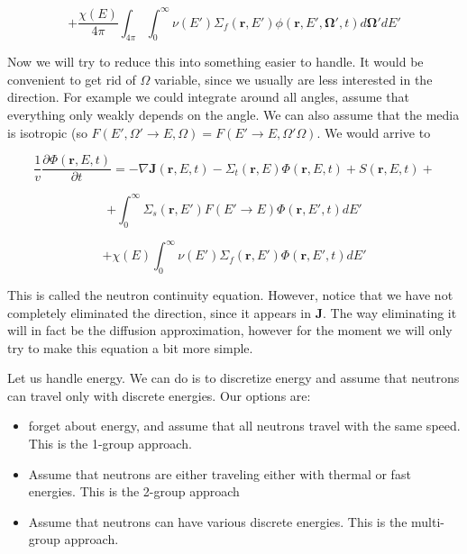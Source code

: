\begin{equation*}
+\frac{\chi(E)}{4\pi}\int_{4\pi}\int_{0}^\infty \nu(E')\Sigma_f(\mathbf{r},E')\phi(\mathbf{r},E',\mathbf{\Omega'},t)d\mathbf{\Omega'}dE'
\end{equation*}

Now we will try to reduce this into something easier to handle. It would be convenient to get rid of $\Omega$ variable, since we usually are less interested in the direction. For example we could integrate around all angles, assume that everything only weakly depends on the angle. We can also assume that the media is isotropic (so $F(E',\Omega' \rightarrow E,\Omega)=F(E'\rightarrow E,\Omega'\Omega)$. We would arrive to%

\begin{equation}
\frac{1}{v}\frac{\partial\Phi(\mathbf{r},E,t)}{\partial t}=-\nabla \mathbf{J}(\mathbf{r},E,t)-\Sigma_t(\mathbf{r},E)\Phi(\mathbf{r},E,t)+S(\mathbf{r},E,t) +
\end{equation}

\begin{equation*}
+\int_{0}^\infty \Sigma_s(\mathbf{r},E')F(E' \rightarrow E)\Phi(\mathbf{r},E',t)dE'
\end{equation*}

\begin{equation*}
+\chi(E)\int_{0}^\infty \nu(E')\Sigma_f(\mathbf{r},E')\Phi(\mathbf{r},E',t)dE'
\end{equation*}

This is called the neutron continuity equation. However, notice that we have not completely eliminated the direction, since it appears in $\mathbf{J}$. The way eliminating it will in fact be the diffusion approximation, however for the moment we will only try to make this equation a bit more simple. 

Let us handle energy. We can do is to discretize energy and assume that neutrons can travel only with discrete energies. Our options are:

\begin{itemize}
\item forget about energy, and assume that all neutrons travel with the same speed. This is the 1-group approach.
\item Assume that neutrons are either traveling either with thermal or fast energies. This is the 2-group approach
\item Assume that neutrons can have various discrete energies. This is the multi-group approach.
\end{itemize}
    
